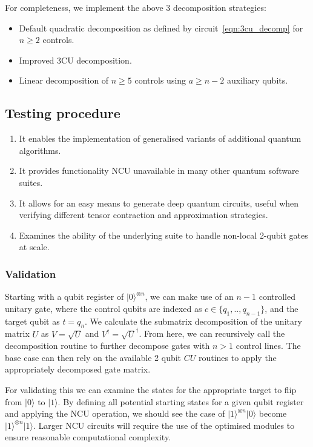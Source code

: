 For completeness, we implement the above 3 decomposition strategies:
\begin{itemize}
\item Default quadratic decomposition as defined by circuit~\eqref{eqn:3cu_decomp} for $n \geq 2$ controls.
\item Improved 3CU decomposition.
\item Linear decomposition of $n\geq5$ controls using $a\geq n-2$ auxiliary qubits.
\end{itemize}
 
\subsection{Testing procedure}

\begin{enumerate}
\item It enables the implementation of generalised variants of additional quantum algorithms.
\item It provides functionality NCU unavailable in many other quantum software suites.
\item It allows for an easy means to generate deep quantum circuits, useful when verifying different tensor contraction and approximation strategies.
\item Examines the ability of the underlying suite to handle non-local 2-qubit gates at scale.
\end{enumerate}


\subsubsection{Validation}
Starting with a qubit register of $\vert 0 \rangle^{\otimes n}$, we can make use of an $n-1$ controlled unitary gate, where the control qubits are indexed as $c \in \{q_1,..,q_{n-1} \}$, and the target qubit as $ t = q_n$. We calculate the submatrix decomposition of the unitary matrix $U$ as $V=\sqrt{U}$ and $V^{\dagger}=\sqrt{U}^{\dagger}$. From here, we can recursively call the decomposition routine to further decompose gates with $n>1$ control lines. The base case can then rely on the available 2 qubit $CU$ routines to apply the appropriately decomposed gate matrix.

For validating this we can examine the states for the appropriate target to flip from $\vert 0\rangle$ to $\vert 1 \rangle$. By defining all potential starting states for a given qubit register and applying the NCU operation, we should see the case of $\vert 1 \rangle^{\otimes n} \vert 0 \rangle$ become $\vert 1 \rangle^{\otimes n} \vert 1 \rangle$. Larger NCU circuits will require the use of the optimised modules to ensure reasonable computational complexity.

